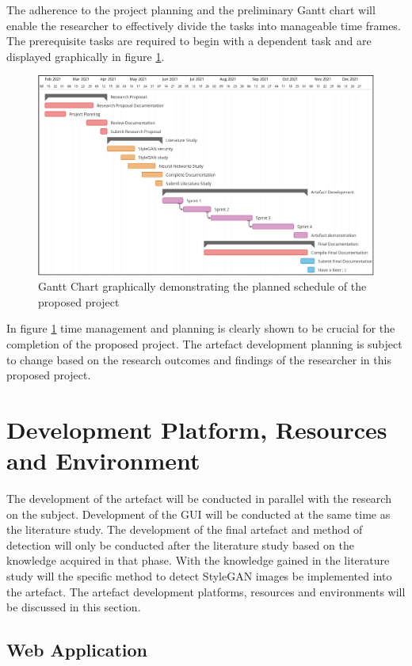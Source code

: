 The adherence to the project planning and the preliminary Gantt chart will enable the researcher to effectively divide the tasks into manageable time frames. The prerequisite tasks are required to begin with a dependent task and are displayed graphically in figure \ref{fig:3}.

\begin{figure}[H]%
\centering
\includegraphics[width=1\textwidth]{img/ganttfinal.png}%
\caption{Gantt Chart graphically demonstrating the planned schedule of the proposed project}%
\label{fig:3}%
\end{figure}

In figure \ref{fig:3} time management and planning is clearly shown to be crucial for the completion of the proposed project. The artefact development planning is subject to change based on the research outcomes and findings of the researcher in this proposed project. 

\section{Development Platform, Resources and Environment}

The development of the artefact will be conducted in parallel with the research on the subject. Development of the GUI will be conducted at the same time as the literature study. The development of the final artefact and method of detection will only be conducted after the literature study based on the knowledge acquired in that phase. With the knowledge gained in the literature study will the specific method to detect StyleGAN images be implemented into the artefact. The artefact development platforms, resources and environments will be discussed in this section.

\subsection{Web Application}

